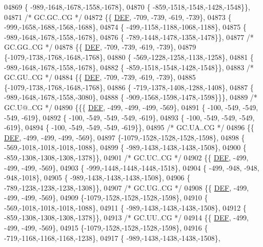 \begin{DoxyCode}
04869 \{ -989,-1648,-1678,-1558,-1678\},
04870 \{ -859,-1518,-1548,-1428,-1548\}\},
04871 \textcolor{comment}{/* GC.GC..CG */}
04872 \{\{  \mbox{\hyperlink{1_88_84__epars_8h_a397419fc12b37ed479c8abb9d444d843}{DEF}}, -709, -739, -619, -739\},
04873 \{ -999,-1658,-1688,-1568,-1688\},
04874 \{ -499,-1158,-1188,-1068,-1188\},
04875 \{ -989,-1648,-1678,-1558,-1678\},
04876 \{ -789,-1448,-1478,-1358,-1478\}\},
04877 \textcolor{comment}{/* GC.GG..CG */}
04878 \{\{  \mbox{\hyperlink{1_88_84__epars_8h_a397419fc12b37ed479c8abb9d444d843}{DEF}}, -709, -739, -619, -739\},
04879 \{-1079,-1738,-1768,-1648,-1768\},
04880 \{ -569,-1228,-1258,-1138,-1258\},
04881 \{ -989,-1648,-1678,-1558,-1678\},
04882 \{ -859,-1518,-1548,-1428,-1548\}\},
04883 \textcolor{comment}{/* GC.GU..CG */}
04884 \{\{  \mbox{\hyperlink{1_88_84__epars_8h_a397419fc12b37ed479c8abb9d444d843}{DEF}}, -709, -739, -619, -739\},
04885 \{-1079,-1738,-1768,-1648,-1768\},
04886 \{ -719,-1378,-1408,-1288,-1408\},
04887 \{ -989,-1648,-1678,-1558,-3080\},
04888 \{ -909,-1568,-1598,-1478,-1598\}\}\},
04889 \textcolor{comment}{/* GC.U@..CG */}
04890 \{\{\{  \mbox{\hyperlink{1_88_84__epars_8h_a397419fc12b37ed479c8abb9d444d843}{DEF}}, -499, -499, -499, -569\},
04891 \{ -100, -549, -549, -549, -619\},
04892 \{ -100, -549, -549, -549, -619\},
04893 \{ -100, -549, -549, -549, -619\},
04894 \{ -100, -549, -549, -549, -619\}\},
04895 \textcolor{comment}{/* GC.UA..CG */}
04896 \{\{  \mbox{\hyperlink{1_88_84__epars_8h_a397419fc12b37ed479c8abb9d444d843}{DEF}}, -499, -499, -499, -569\},
04897 \{-1079,-1528,-1528,-1528,-1598\},
04898 \{ -569,-1018,-1018,-1018,-1088\},
04899 \{ -989,-1438,-1438,-1438,-1508\},
04900 \{ -859,-1308,-1308,-1308,-1378\}\},
04901 \textcolor{comment}{/* GC.UC..CG */}
04902 \{\{  \mbox{\hyperlink{1_88_84__epars_8h_a397419fc12b37ed479c8abb9d444d843}{DEF}}, -499, -499, -499, -569\},
04903 \{ -999,-1448,-1448,-1448,-1518\},
04904 \{ -499, -948, -948, -948,-1018\},
04905 \{ -989,-1438,-1438,-1438,-1508\},
04906 \{ -789,-1238,-1238,-1238,-1308\}\},
04907 \textcolor{comment}{/* GC.UG..CG */}
04908 \{\{  \mbox{\hyperlink{1_88_84__epars_8h_a397419fc12b37ed479c8abb9d444d843}{DEF}}, -499, -499, -499, -569\},
04909 \{-1079,-1528,-1528,-1528,-1598\},
04910 \{ -569,-1018,-1018,-1018,-1088\},
04911 \{ -989,-1438,-1438,-1438,-1508\},
04912 \{ -859,-1308,-1308,-1308,-1378\}\},
04913 \textcolor{comment}{/* GC.UU..CG */}
04914 \{\{  \mbox{\hyperlink{1_88_84__epars_8h_a397419fc12b37ed479c8abb9d444d843}{DEF}}, -499, -499, -499, -569\},
04915 \{-1079,-1528,-1528,-1528,-1598\},
04916 \{ -719,-1168,-1168,-1168,-1238\},
04917 \{ -989,-1438,-1438,-1438,-1508\},

\end{DoxyCode}
